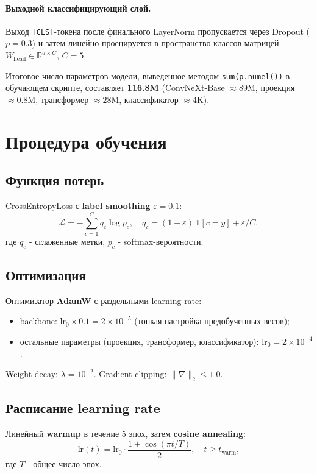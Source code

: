\documentclass[14pt,a4paper]{extreport}
\begin{document}
\paragraph{Выходной классифицирующий слой.} Выход \texttt{[CLS]}-токена
после финального LayerNorm пропускается через Dropout ($p=0.3$) и затем
линейно проецируется в пространство классов матрицей
$W_{\text{head}} \in \mathbb{R}^{d \times C}$, $C = 5$.

Итоговое число параметров модели, выведенное методом
\texttt{sum(p.numel())} в обучающем скрипте, составляет \textbf{116.8M}
(ConvNeXt-Base $\approx 89$M, проекция $\approx 0.8$M, трансформер
$\approx 28$M, классификатор $\approx 4$K).

\section{Процедура обучения}

\subsection{Функция потерь}

CrossEntropyLoss с \textbf{label smoothing} $\varepsilon=0.1$:
\[
    \mathcal{L} = -\sum_{c=1}^{C} q_c \log p_c,
    \quad
    q_c = (1-\varepsilon)\,\mathbf{1}[c=y] + \varepsilon / C,
\]
где $q_c$ - сглаженные метки, $p_c$ - softmax-вероятности.

\subsection{Оптимизация}

Оптимизатор \textbf{AdamW} с раздельными learning rate:
\begin{itemize}
    \item backbone: $\text{lr}_0 \times 0.1 = 2 \times 10^{-5}$ (тонкая
          настройка предобученных весов);
    \item остальные параметры (проекция, трансформер, классификатор):
          $\text{lr}_0 = 2 \times 10^{-4}$.
\end{itemize}
Weight decay: $\lambda = 10^{-2}$. Gradient clipping: $\|\nabla\|_2 \le 1.0$.

\subsection{Расписание learning rate}

Линейный \textbf{warmup} в течение 5 эпох, затем \textbf{cosine annealing}:
\[
    \text{lr}(t) = \text{lr}_0 \cdot \frac{1 + \cos(\pi t/T)}{2},
    \quad t \ge t_\text{warm},
\]
где $T$ - общее число эпох.
\end{document}
